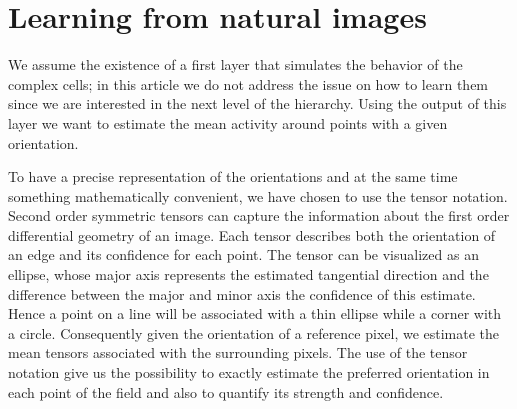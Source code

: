 \documentclass{llncs}
\makeatletter
\DeclareRobustCommand\onedot{\futurelet\@let@token\@onedot}
\def\@onedot{\ifx\@let@token.\else.\null\fi\xspace}
\def\etal{\emph{et al}\onedot}
\makeatother
\begin{document}




\section{Learning from natural images}
\label{sec:ass_learning}

We assume the existence of a first layer that
simulates the behavior of the complex cells; in this
article we do not address the issue on how to learn
them since we are interested in the next level of the hierarchy.
Using the output of this layer we want to estimate the mean
activity around points with a given orientation.

To have a precise representation of the orientations and at the same time
something mathematically convenient, we have chosen to use the tensor notation.
Second order symmetric tensors can capture the information about the first
order differential geometry of an image. Each tensor describes both the
orientation of an edge and its confidence for each point. The tensor can be
visualized as an ellipse, whose major axis represents the estimated tangential
direction and the difference between the major and minor axis the confidence
of this estimate. Hence a point on a line will be associated with a thin
ellipse while a corner with a circle.
Consequently given the orientation of a reference pixel, we estimate the mean
tensors associated with the surrounding pixels. The use of the tensor notation
give us the possibility to exactly estimate the preferred orientation in each
point of the field and also to quantify its strength and confidence.
\end{document}
